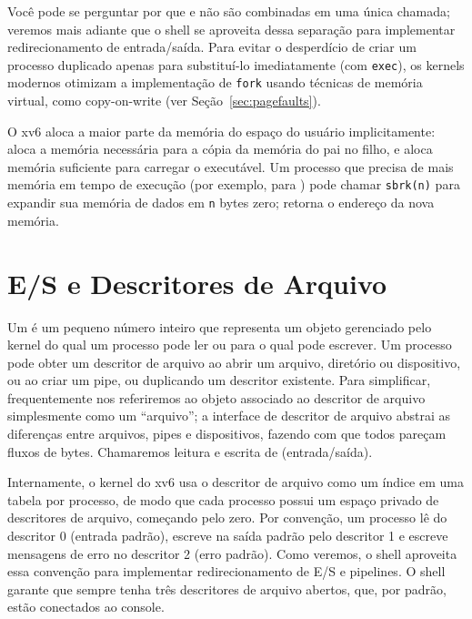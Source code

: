 Você pode se perguntar por que
e
não são combinadas em uma única chamada; veremos mais adiante que
o shell se aproveita dessa separação para implementar
redirecionamento de entrada/saída.
Para evitar o desperdício de criar um processo duplicado apenas para substituí-lo
imediatamente (com \lstinline{exec}),
os kernels modernos otimizam a implementação de
\lstinline{fork}
usando técnicas de memória virtual, como
copy-on-write (ver Seção~\ref{sec:pagefaults}).

O xv6 aloca a maior parte da memória do espaço do usuário
implicitamente:
aloca a memória necessária para a cópia da memória do pai no filho, e
aloca memória suficiente para carregar o executável.
Um processo que precisa de mais memória em tempo de execução (por exemplo, para
)
pode chamar
\lstinline{sbrk(n)}
para expandir sua memória de dados em
\lstinline{n} bytes zero;
retorna o endereço da nova memória.


\section{E/S e Descritores de Arquivo}

Um 
é um pequeno número inteiro que representa um objeto gerenciado pelo kernel
do qual um processo pode ler ou para o qual pode escrever.
Um processo pode obter um descritor de arquivo ao abrir um arquivo, diretório
ou dispositivo, ou ao criar um pipe, ou duplicando um descritor
existente.
Para simplificar, frequentemente nos referiremos ao objeto associado ao descritor de arquivo
simplesmente como um ``arquivo'';  
a interface de descritor de arquivo abstrai as diferenças entre
arquivos, pipes e dispositivos, fazendo com que todos pareçam fluxos de bytes.
Chamaremos leitura e escrita de  (entrada/saída).

Internamente, o kernel do xv6 usa o descritor de arquivo
como um índice em uma tabela por processo,
de modo que cada processo possui um espaço privado de descritores de arquivo,
começando pelo zero.
Por convenção, um processo lê do descritor 0 (entrada padrão),
escreve na saída padrão pelo descritor 1 e
escreve mensagens de erro no descritor 2 (erro padrão).
Como veremos, o shell aproveita essa convenção para implementar redirecionamento de E/S
e pipelines. O shell garante que sempre tenha três descritores de arquivo
abertos,
que, por padrão, estão conectados ao console.

